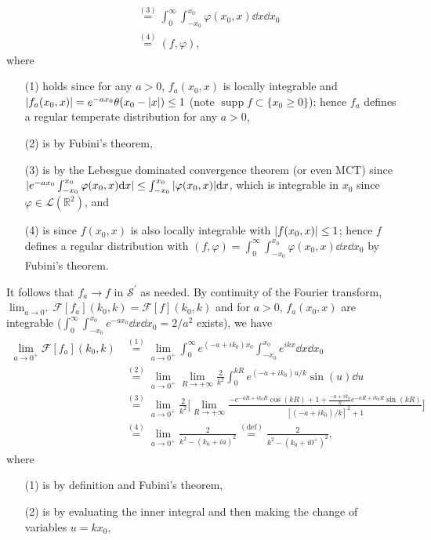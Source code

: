 \documentclass[11pt]{article}
\newcommand{\eq}[1]{\overset{(#1)}{=}}
\DeclareMathOperator{\supp}{supp}
\begin{document}
\begin{enumerate}
\begin{enumerate}[label=(\roman*)]
\begin{align*}
            &\eq{3} \int_0^\infty \int_{-x_0}^{x_0}\varphi(x_0,x)\dd x\dd x_0\\
            &\eq{4} (f,\varphi),
        \end{align*} where \begin{enumerate}
            \item[(1)] holds since for any $a>0$, $f_a(x_0,x)$ is locally integrable and $\abs{f_a(x_0,x)} = e^{-ax_0}\theta(x_0-\abs{x}) \leq 1$ (note $\supp f\subset \{x_0\geq 0\}$); hence $f_a$ defines a regular temperate distribution for any $a>0$,
            \item[(2)] is by Fubini's theorem,
            \item[(3)] is by the Lebesgue dominated convergence theorem (or even MCT) since $|e^{-ax_0}\int_{-x_0}^{x_0}\varphi(x_0,x)\dd x |\leq \int_{-x_0}^{x_0}\abs{\varphi(x_0,x)}\dd x$, which is integrable in $x_0$ since $\varphi\in \mathcal L(\mathbb R^2)$, and
            \item[(4)] is since $f(x_0,x)$ is also locally integrable with $\abs{f(x_0,x)}\leq 1$; hence $f$ defines a regular distribution with $(f,\varphi) = \int_0^\infty \int_{-x_0}^{x_0}\varphi(x_0,x)\dd x\dd x_0$ by Fubini's theorem.
        \end{enumerate} It follows that $f_a\to f$ in $\mathcal S^\prime$ as needed. By continuity of the Fourier transform, $\lim_{a\to 0^+}\mathcal F[f_a](k_0,k) = \mathcal F[f](k_0,k)$ and for $a>0$, $f_a(x_0,x)$ are integrable ($\int_0^\infty \int_{-x_0}^{x_0}e^{-ax_0}\dd x\dd x_0 = 2/a^2$ exists), we have
        \begin{align*}
            \lim_{a\to 0^+}\mathcal F[f_a](k_0,k) &\eq{1} \lim_{a\to 0^+} \int_0^\infty e^{(-a+ik_0)x_0}\int_{-x_0}^{x_0}e^{ikx}\dd x \dd x_0\\
        &\eq{2} \lim_{a\to 0^+} \lim_{R\to+\infty} \frac{2}{k^2}\int_0^{kR} e^{(-a+ik_0)u/k}\sin(u) \dd u\\
        &\eq{3} \lim_{a\to 0^+}  \frac{2}{k^2}\bigg[\lim_{R\to+\infty} \frac{-e^{-aR+ik_0R}\cos(kR)+1+\frac{-a+ik_0}{k}e^{-aR+ik_0R}\sin(kR)}{[(-a+ik_0)/k]^2+1}\bigg]\\
        &\eq{4} \lim_{a\to 0^+}  \frac{2}{k^2-(k_0+ia)^2} \eq{\text{def}} \frac{2}{k^2-(k_0+i0^+)^2},
        \end{align*} where \begin{enumerate}
            \item[(1)] is by definition and Fubini's theorem,
            \item[(2)] is by evaluating the inner integral and then making the change of variables $u = kx_0$,

\end{enumerate}
\end{enumerate}
\end{enumerate}
\end{document}
